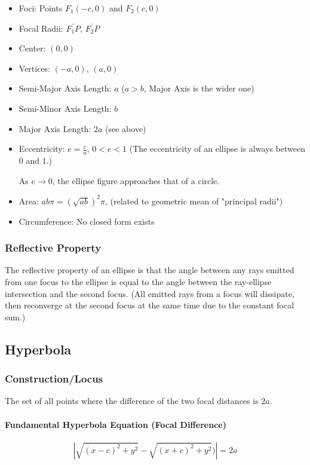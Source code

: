 \documentclass{article}
\begin{document}
\begin{itemize}
    \item Foci: Points $F_1(-c, 0)$ and $F_2(c, 0)$
    \item Focal Radii: $\overline{F_1P}$, $\overline{F_2P}$
    \item Center: $(0, 0)$
    \item Vertices: $(-a, 0)$, $(a, 0)$
    \item Semi-Major Axis Length: $a$ ($a > b$, Major Axis is the wider one)
    \item Semi-Minor Axis Length: $b$
    \item Major Axis Length: $2a$ (see above)
    \item Eccentricity: $e = \frac{c}{a}$, $0 < e < 1$ (The eccentricity of an ellipse is always between $0$ and $1$.)

        As $e \to 0$, the ellipse figure approaches that of a circle.
    \item Area: $ab\pi = (\sqrt{ab})^2\pi$, (related to geometric mean of "principal radii")
    \item Circumference: No closed form exists
\end{itemize}

\subsubsection{Reflective Property}
The reflective property of an ellipse is that the angle between any rays emitted from one focus to the ellipse is equal to the angle between the ray-ellipse intersection and the second focus. (All emitted rays from a focus will dissipate, then reconverge at the second focus at the same time due to the constant focal sum.)

\subsection{Hyperbola}
\subsubsection{Construction/Locus}
The set of all points where the difference of the two focal distances is $2a$.

\paragraph{Fundamental Hyperbola Equation (Focal Difference)}
$$|\sqrt{(x-c)^2+y^2}-\sqrt{(x+c)^2+y^2})| = 2a$$
\end{document}
